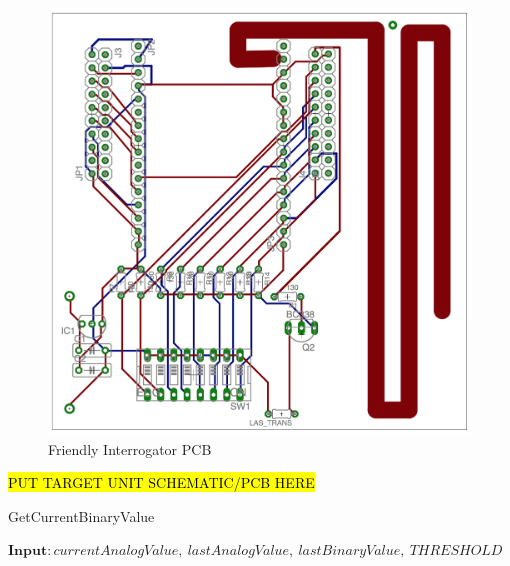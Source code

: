 \documentclass[letterpaper,10pt]{article}
\begin{document}
\begin{spacing}{1.15}
\begin{figure} [H]
	\centering
	\includegraphics[scale=0.37]{interrogator_pcb.png}
	\caption{Friendly Interrogator PCB\label{fig:interrogator-pcb}}
\end{figure}

%


\hl{PUT TARGET UNIT SCHEMATIC/PCB HERE}


\makeatletter
\def\BState{\State\hskip-\ALG@thistlm}
\makeatother

\begin{algorithm}[H]
	\caption{GetCurrentBinaryValue}\label{algo-1}
	\begin{algorithmic}[1]
		\State $\textbf{Input}: \textit{currentAnalogValue},\ \textit{lastAnalogValue},\ \textit{lastBinaryValue},\ \textit{THRESHOLD}$\\
		

\end{algorithmic}
\end{algorithm}
\end{spacing}
\end{document}
